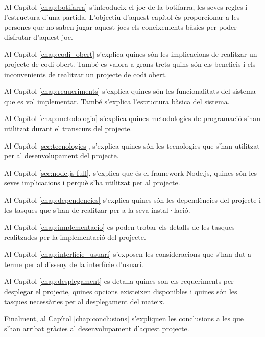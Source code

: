 Al Capítol \ref{chap:botifarra} s'introdueix el joc de la botifarra, les seves regles i l'estructura d'una partida. L'objectiu d'aquest capítol és proporcionar a les persones que no saben jugar aquest jocs els coneixements bàsics per poder disfrutar d'aquest joc. 

Al Capítol \ref{chap:codi_obert} s'explica quines són les implicacions de realitzar un projecte de codi obert. També es valora a grans trets quins són els beneficis i els inconvenients de realitzar un projecte de codi obert.

Al Capítol \ref{chap:requeriments} s'explica quines són les funcionalitats del sistema que es vol implementar. També s'explica l'estructura bàsica del sistema. 

Al Capítol \ref{chap:metodologia} s'explica quines metodologies de programació s'han utilitzat durant el transcurs del projecte.

Al Capítol \ref{sec:tecnologies}, s'explica quines són les tecnologies que s'han utilitzat per al desenvolupament del projecte.

Al Capítol \ref{sec:node.js-full}, s'explica que és el framework Node.js, quines són les seves implicacions i perquè s'ha utilitzat per al projecte. 

Al Capítol \ref{chap:dependencies} s'explica quines són les dependències del projecte i les tasques que s'han de realitzar per a la seva instal·lació. 

Al Capítol \ref{chap:implementacio} es poden trobar els detalls de les tasques realitzades per la implementació del projecte. 

Al Capítol \ref{chap:interficie_usuari} s'exposen les consideracions que s'han dut a terme per al disseny de la interfície d'usuari.

Al Capítol \ref{chap:desplegament} es detalla quines son els requeriments per desplegar el projecte, quines opcions existeixen disponibles i quines són les tasques necessàries per al desplegament del mateix. 

Finalment, al Capítol \ref{chap:conclusions} s'expliquen les conclusions a les que s'han arribat gràcies al desenvolupament d'aquest projecte. 
